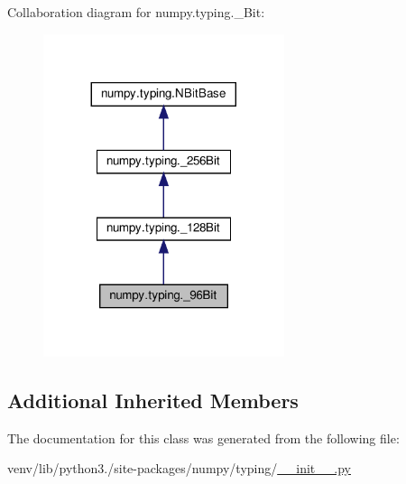 Collaboration diagram for numpy.\+typing.\+\_\+Bit\+:
\nopagebreak
\begin{figure}[H]
\begin{center}
\leavevmode
\includegraphics[width=200pt]{classnumpy_1_1typing_1_1__96Bit__coll__graph}
\end{center}
\end{figure}
\subsection*{Additional Inherited Members}


The documentation for this class was generated from the following file\+:\begin{DoxyCompactItemize}
\item 
venv/lib/python3./site-\/packages/numpy/typing/\hyperlink{venv_2lib_2python3_89_2site-packages_2numpy_2typing_2____init_____8py}{\+\_\+\+\_\+init\+\_\+\+\_\+.\+py}\end{DoxyCompactItemize}

